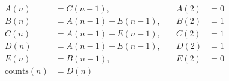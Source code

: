 \documentclass{article}
\begin{document}
\begin{align*}
A(n) &= C(n-1), \quad &A(2) &= 0 \\
B(n) &= A(n-1) + E(n-1), \quad &B(2) &= 1 \\
C(n) &= A(n-1) + E(n-1), \quad &C(2) &= 1 \\
D(n) &= A(n-1) + E(n-1), \quad &D(2) &= 1 \\
E(n) &= B(n-1), \quad &E(2) &= 0 \\
\text{counts}(n) &= D(n)
\end{align*}
\end{document}

